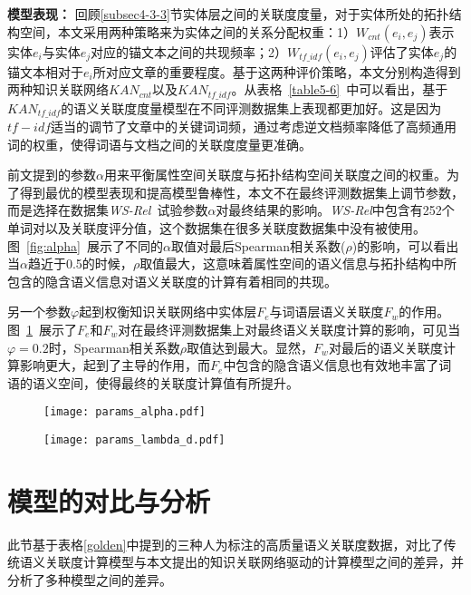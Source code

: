 \textbf{模型表现：}
回顾\ref{subsec4-3-3}节实体层之间的关联度度量，对于实体所处的拓扑结构空间，本文采用两种策略来为实体之间的关系分配权重：1）$W_{cnt}(e_i,e_j)$表示实体$e_i$与实体$e_j$对应的锚文本之间的共现频率；2）$W_{tf\_idf}(e_i,e_j)$评估了实体$e_j$的锚文本相对于$e_i$所对应文章的重要程度。基于这两种评价策略，本文分别构造得到两种知识关联网络$KAN_{cnt}$以及$KAN_{tf\_idf}$。从表格~\ref{table5-6}~中可以看出，基于$KAN_{tf\_idf}$的语义关联度度量模型在不同评测数据集上表现都更加好。这是因为$tf-idf$适当的调节了文章中的关键词词频，通过考虑逆文档频率降低了高频通用词的权重，使得词语与文档之间的关联度度量更准确。

前文提到的参数$\alpha$用来平衡属性空间关联度与拓扑结构空间关联度之间的权重。为了得到最优的模型表现和提高模型鲁棒性，本文不在最终评测数据集上调节参数，而是选择在数据集\emph{WS-Rel}~\cite{ws/AgirreAHKPS09}试验参数$\alpha$对最终结果的影响。\emph{WS-Rel}中包含有252个单词对以及关联度评分值，这个数据集在很多关联度数据集中没有被使用。图~\ref{fig:alpha}~展示了不同的$\alpha$取值对最后Spearman相关系数($\rho$)的影响，可以看出当$\alpha$趋近于0.5的时候，$\rho$取值最大，这意味着属性空间的语义信息与拓扑结构中所包含的隐含语义信息对语义关联度的计算有着相同的共现。

另一个参数$\varphi$起到权衡知识关联网络中实体层$F_e$与词语层语义关联度$F_w$的作用。图~\ref{fig:lambda}~展示了$F_e$和$F_w$对在最终评测数据集上对最终语义关联度计算的影响，可见当$\varphi=0.2$时，Spearman相关系数$\rho$取值达到最大。显然，$F_w$对最后的语义关联度计算影响更大，起到了主导的作用，而$F_e$中包含的隐含语义信息也有效地丰富了词语的语义空间，使得最终的关联度计算值有所提升。

\begin{figure}[htbp]
    \begin{minipage}{0.48\textwidth}
      \centering
      \texttt{[image: params\_alpha.pdf]}
      \label{fig:alpha}
    \end{minipage}\hfill
    \begin{minipage}{0.48\textwidth}
      \centering
      \texttt{[image: params\_lambda\_d.pdf]}
      \label{fig:lambda}
    \end{minipage}
\end{figure}


\section{模型的对比与分析}
此节基于表格\ref{golden}中提到的三种人为标注的高质量语义关联度数据，对比了传统语义关联度计算模型与本文提出的知识关联网络驱动的计算模型之间的差异，并分析了多种模型之间的差异。

